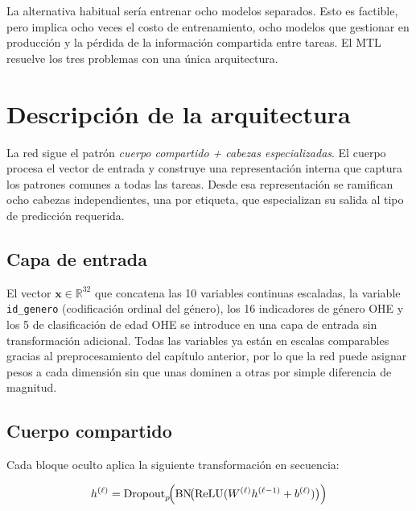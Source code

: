 \documentclass[12pt, a4paper]{report}
\newcommand{\variable}[1]{\texttt{\small #1}}
\begin{document}
La alternativa habitual sería entrenar ocho modelos separados. Esto es factible, pero implica ocho veces el costo de entrenamiento, ocho modelos que gestionar en producción y la pérdida de la información compartida entre tareas. El MTL resuelve los tres problemas con una única arquitectura.

\section{Descripción de la arquitectura}

La red sigue el patrón \emph{cuerpo compartido + cabezas especializadas}. El cuerpo procesa el vector de entrada y construye una representación interna que captura los patrones comunes a todas las tareas. Desde esa representación se ramifican ocho cabezas independientes, una por etiqueta, que especializan su salida al tipo de predicción requerida.

\subsection{Capa de entrada}

El vector $\mathbf{x} \in \mathbb{R}^{32}$ que concatena las 10 variables continuas escaladas, la variable \variable{id\_genero} (codificación ordinal del género), los 16 indicadores de género OHE y los 5 de clasificación de edad OHE se introduce en una capa de entrada sin transformación adicional. Todas las variables ya están en escalas comparables gracias al preprocesamiento del capítulo anterior, por lo que la red puede asignar pesos a cada dimensión sin que unas dominen a otras por simple diferencia de magnitud.

\subsection{Cuerpo compartido}

Cada bloque oculto aplica la siguiente transformación en secuencia:

\[
  h^{(\ell)} = \text{Dropout}_p\!\Bigl(\text{BN}\!\bigl(\text{ReLU}(W^{(\ell)} h^{(\ell-1)} + b^{(\ell)})\bigr)\Bigr)
\]
\end{document}
